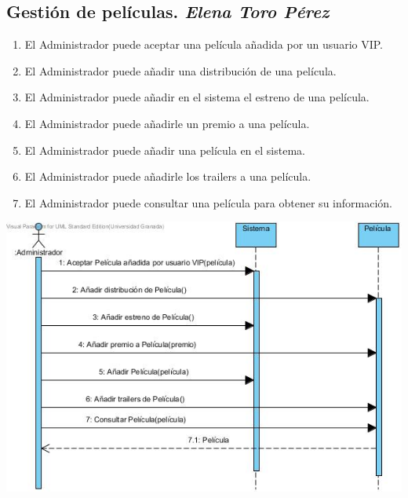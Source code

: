\documentclass{article}
\begin{document}
	\subsection*{Gestión de películas. \textit{Elena Toro Pérez}}
		\begin{enumerate}
   	 		\item El Administrador puede aceptar una película añadida por un usuario VIP.
   		    \item El Administrador puede añadir una distribución de una película.
        		\item El Administrador puede añadir en el sistema el estreno de una película.
        		\item El Administrador puede añadirle un premio a una película.
        		\item El Administrador puede añadir una película en el sistema.
        		\item El Administrador puede añadirle los trailers a una película.
        		\item El Administrador puede consultar una película para obtener su información.
    		\end{enumerate}
    		\includegraphics[width=1\linewidth]{./S-peliculas}
\end{document}
